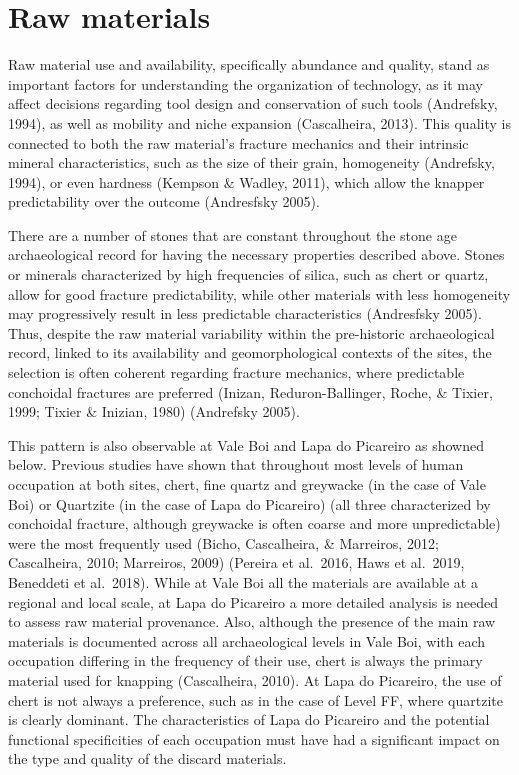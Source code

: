 \documentclass[12pt,twoside]{reedthesis}
\begin{document}
\hypertarget{raw-materials}{%
\section{Raw materials}\label{raw-materials}}

Raw material use and availability, specifically abundance and quality, stand as important factors for understanding the organization of technology, as it may affect decisions regarding tool design and conservation of such tools (Andrefsky, 1994), as well as mobility and niche expansion (Cascalheira, 2013). This quality is connected to both the raw material's fracture mechanics and their intrinsic mineral characteristics, such as the size of their grain, homogeneity (Andrefsky, 1994), or even hardness (Kempson \& Wadley, 2011), which allow the knapper predictability over the outcome (Andresfsky 2005).

There are a number of stones that are constant throughout the stone age archaeological record for having the necessary properties described above. Stones or minerals characterized by high frequencies of silica, such as chert or quartz, allow for good fracture predictability, while other materials with less homogeneity may progressively result in less predictable characteristics (Andresfsky 2005). Thus, despite the raw material variability within the pre-historic archaeological record, linked to its availability and geomorphological contexts of the sites, the selection is often coherent regarding fracture mechanics, where predictable conchoidal fractures are preferred (Inizan, Reduron-Ballinger, Roche, \& Tixier, 1999; Tixier \& Inizian, 1980) (Andrefsky 2005).

This pattern is also observable at Vale Boi and Lapa do Picareiro as showned below. Previous studies have shown that throughout most levels of human occupation at both sites, chert, fine quartz and greywacke (in the case of Vale Boi) or Quartzite (in the case of Lapa do Picareiro) (all three characterized by conchoidal fracture, although greywacke is often coarse and more unpredictable) were the most frequently used (Bicho, Cascalheira, \& Marreiros, 2012; Cascalheira, 2010; Marreiros, 2009) (Pereira et al.~2016, Haws et al.~2019, Beneddeti et al.~2018). While at Vale Boi all the materials are available at a regional and local scale, at Lapa do Picareiro a more detailed analysis is needed to assess raw material provenance. Also, although the presence of the main raw materials is documented across all archaeological levels in Vale Boi, with each occupation differing in the frequency of their use, chert is always the primary material used for knapping (Cascalheira, 2010). At Lapa do Picareiro, the use of chert is not always a preference, such as in the case of Level FF, where quartzite is clearly dominant. The characteristics of Lapa do Picareiro and the potential functional specificities of each occupation must have had a significant impact on the type and quality of the discard materials.
\end{document}
